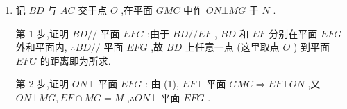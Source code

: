 \begin{enumerate}
\begin{jieda}
\begin{enumerate}
            $\left. \begin{array}{l} {EF}//{BD},{BD} \bot  {MC} \Longrightarrow  {EF} \bot  {MC}, \\  {GC} \bot  {ABCD} \Longrightarrow  {GC} \bot  {EF}, \\  {MC} \cap  {GC} = C \end{array}\right\}   \Longrightarrow  {EF} \bot$ 平面 ${GMC}$ ,证毕.
            \item 记 ${BD}$ 与 ${AC}$ 交于点 $O$ ,在平面 ${GMC}$ 中作 ${ON}\bot {MG}$ 于 $N$ . 
            
            第 1 步,证明 ${BD}//$ 平面 ${EFG}$ :由于 ${BD}//{EF}$ , ${BD}$ 和 ${EF}$ 分别在平面 ${EFG}$ 外和平面内, $\therefore {BD}//$ 平面 ${EFG}$ ,故 ${BD}$ 上任意一点 (这里取点 $O$ ) 到平面 ${EFG}$ 的距离即为所求. 
            
            第 2 步,证明 ${ON} \bot$ 平面 ${EFG}$ : 由 (1), ${EF} \bot$ 平面 ${GMC} \Longrightarrow  {EF} \bot  {ON}$ ,又 ${ON} \bot  {MG},{EF} \cap  {MG} = M$ ,$\therefore {ON} \bot$ 平面 ${EFG}$ . 
            

\end{enumerate}
\end{jieda}
\end{enumerate}
